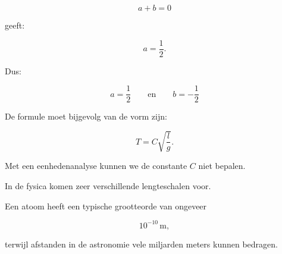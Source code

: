 \documentclass{ximera}
\begin{document}
\begin{oefening}{\oefG}
\begin{question}
\begin{oplossing}
\[
a+b=0
\]

geeft:

\[
a=\frac{1}{2}.
\]

Dus:

\[
\boxed{
a=\frac{1}{2}
\qquad\text{en}\qquad
b=-\frac{1}{2}
}
\]

De formule moet bijgevolg van de vorm zijn:

\[
T
=
C
\sqrt{\frac{l}{g}}.
\]

Met een eenhedenanalyse kunnen we de constante $C$ niet bepalen.
\end{oplossing}
\end{question}

\end{oefening}








In de fysica komen zeer verschillende lengteschalen voor.

Een atoom heeft een typische grootteorde van ongeveer

\[
10^{-10}\,\mathrm m,
\]

terwijl afstanden in de astronomie vele miljarden meters kunnen
bedragen.
\end{document}
